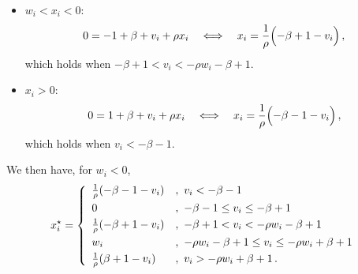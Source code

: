 \documentclass[letter,10pt]{article}
\theoremstyle{definition}
\theoremstyle{nonumberplain}
\begin{document}
\begin{itemize}
\begin{itemize}
			\item $w_i < x_i < 0$:
				$$
					0 = -1 + \beta + v_i + \rho x_i
					\quad\Longleftrightarrow\quad
					x_i = \frac{1}{\rho}\Bigl(-\beta + 1 - v_i\Bigr)\,,
				$$
				which holds when $-\beta + 1 < v_i < -\rho w_i - \beta + 1$.

			\item $x_i > 0$:
				$$
					0 = 1 + \beta + v_i + \rho x_i
					\quad\Longleftrightarrow\quad
					x_i = \frac{1}{\rho}\Bigl(-\beta - 1 - v_i\Bigr)\,,
				$$
				which holds when $v_i < -\beta -1$.
		\end{itemize}
		We then have, for $w_i < 0$,
		$$
			x_i^\star =
			\left\{
				\begin{array}{ll}
					\frac{1}{\rho}(-\beta - 1 - v_i) &,\,\, v_i < -\beta -1 \vspace{0.1cm}\\
					0                                &,\,\, -\beta -1 \leq v_i \leq -\beta + 1 \vspace{0.1cm}\\
					\frac{1}{\rho}(-\beta + 1 - v_i) &,\,\, -\beta + 1 < v_i <-\rho w_i -\beta +1\vspace{0.1cm}\\
					w_i   &,\,\, -\rho w_i -\beta +1 \leq v_i \leq -\rho w_i +\beta +1 \vspace{0.1cm}\\
					\frac{1}{\rho}(\beta + 1 - v_i) &,\,\, v_i> -\rho w_i + \beta + 1\,.
				\end{array}
			\right.
		$$
	\end{itemize}
\end{document}
